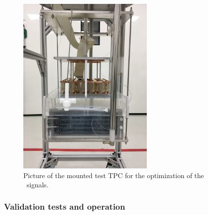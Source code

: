 \begin{figure}[!t]
\centering
\includegraphics[angle=-90,width=0.6\textwidth]{./Figures/proto0_mockup.jpeg}
\caption[Picture of the mounted test TPC for the optimization of the \STwo\ signals.]{Picture of the mounted test TPC for the optimization of the \STwo\ signals.}
\label{fig:proto0_mockup}
\end{figure}

\subsubsection{Validation tests and operation}

